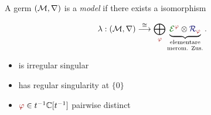 \begin{defn}
  \def\myPhi{\textcolor{red!60!black}{\phi}}
  \def\myE{\textcolor{green!40!black}{\cE^{\myPhi}}}
  A germ $(\mathcal{M},\nabla)$ is a \emph{model} if there exists a isomorphism
  \begin{multicols}{2}
    \[
      \lambda:(\cM,\nabla)
      \overset{\cong}{\longrightarrow}
      \bigoplus_{~\tikzmark{e3}\!\!\myPhi}
      \underset{\text{merom. Zus.}}{%
        \underset{\text{elementare}}{%
          \underbrace{%
            \overset{\tikzmark{e2}}{\myE}
            \otimes
            \overset{\tikzmark{e1}}{\textcolor{blue!40!black}{\cR_{\myPhi}}}
          }
        }
      }\,.
    \]
    \columnbreak{}
    \begin{itemize}
      \item[\tikzmarkb{n2}{green}] is irregular singular
      \item[\tikzmarkc{n1}{blue}] has regular singularity at $\{0\}$
      \item[\tikzmarkc{n3}{red}] $\myPhi\in t^{-1}\C[t^{-1}]$ pairwise distinct
    \end{itemize}
  \end{multicols}
\end{defn}
